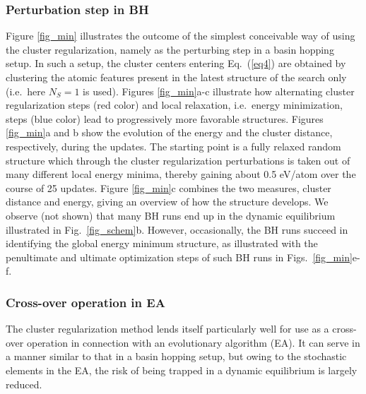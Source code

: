 \documentclass[aip,amsmath,amssymb,reprint]{revtex4-1}
\begin{document}
\subsubsection{Perturbation step in BH}
Figure \ref{fig_min} illustrates the outcome of the simplest
conceivable way of using the cluster regularization, namely as the
perturbing step in a basin hopping setup. In such a setup, the cluster
centers entering Eq.\ (\ref{eq4}) are obtained by clustering the
atomic features present in the latest structure of the search only (i.e.\ here $N_S=1$ is used). Figures
\ref{fig_min}a-c illustrate how alternating cluster regularization
steps (red color) and local relaxation, i.e.\ energy minimization,
steps (blue color) lead to progressively more favorable
structures. Figures \ref{fig_min}a and b show the evolution of the
energy and the cluster distance, respectively, during the updates. The
starting point is a fully relaxed random structure which through the
cluster regularization perturbations is taken out of many different
local energy minima, thereby gaining about 0.5 eV/atom over the course of
25 updates. Figure \ref{fig_min}c combines the two measures, cluster
distance and energy, giving an overview of how the structure
develops. We observe (not shown) that many BH runs end up in the dynamic
equilibrium illustrated in Fig.\  \ref{fig_schem}b. However, occasionally, the BH runs succeed in
identifying the global energy minimum structure, as illustrated with
the penultimate and ultimate optimization steps of such BH runs in
Figs.\  \ref{fig_min}e-f.

\subsubsection{Cross-over operation in EA}
The cluster regularization method lends itself particularly well for
use as a cross-over operation in connection with an evolutionary algorithm (EA). It can
serve in a manner similar to that in a basin hopping setup, but owing
to the stochastic elements in the EA, the risk of being trapped in a
dynamic equilibrium is largely reduced.
\end{document}
